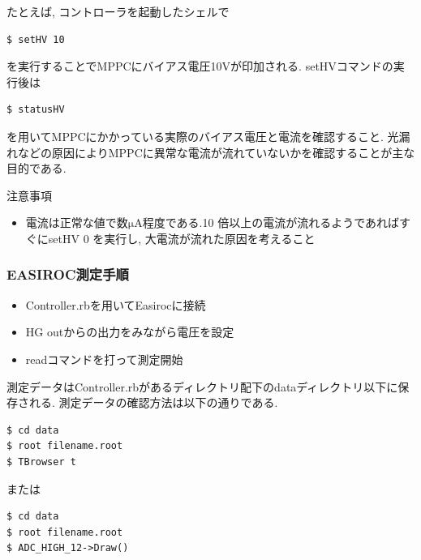 たとえば, コントローラを起動したシェルで
\begin{lstlisting}
$ setHV 10
\end{lstlisting}
を実行することでMPPCにバイアス電圧10Vが印加される.
setHVコマンドの実行後は
\begin{lstlisting}
$ statusHV
\end{lstlisting}
を用いてMPPCにかかっている実際のバイアス電圧と電流を確認すること.
光漏れなどの原因によりMPPCに異常な電流が流れていないかを確認することが主な目的である.

\begin{itembox}[l]{注意事項}
  \begin{itemize}
    \item 電流は正常な値で数$\mathrm{\mu A}$程度である.10 倍以上の電流が流れるようであればすぐにsetHV 0 を実行し, 大電流が流れた原因を考えること
  \end{itemize}
\end{itembox}

\subsubsection{EASIROC測定手順}
\begin{itemize}
  \item Controller.rbを用いてEasirocに接続
  \item HG outからの出力をみながら電圧を設定
  \item readコマンドを打って測定開始
\end{itemize}
測定データはController.rbがあるディレクトリ配下のdataディレクトリ以下に保存される.
測定データの確認方法は以下の通りである.
\begin{lstlisting}
$ cd data
$ root filename.root
$ TBrowser t
\end{lstlisting}
または
\begin{lstlisting}
$ cd data
$ root filename.root
$ ADC_HIGH_12->Draw()
\end{lstlisting}

